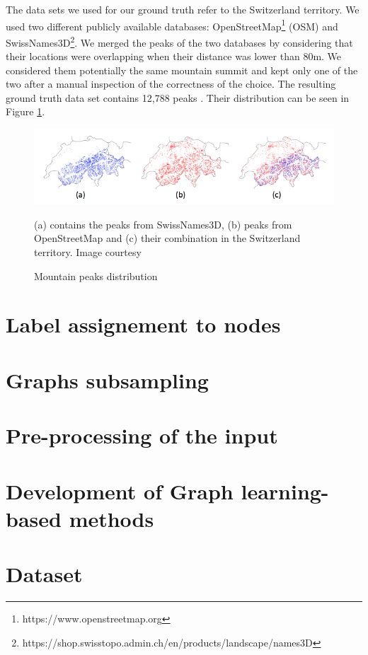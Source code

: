 The data sets we used for our ground truth refer to the Switzerland territory. We used two different publicly available databases: OpenStreetMap\footnote{https://www.openstreetmap.org} (OSM) and SwissNames3D\footnote{https://shop.swisstopo.admin.ch/en/products/landscape/names3D}. We merged the peaks of the two databases by considering that their locations were overlapping when their distance was lower than 80m. We considered them potentially the same mountain summit and kept only one of the two after a manual inspection of the correctness of the choice. The resulting ground truth data set contains 12,788 peaks \cite{AI3D-DL-PE}. Their distribution can be seen in Figure \ref{fig:switzerland_peaks}.

\begin{figure} 
\centering
\includegraphics[width=13cm]{pictures/switzerland_peaks.png}
\caption{Mountain peaks distribution}
(a) contains the peaks from SwissNames3D, (b) peaks from OpenStreetMap and (c) their combination in the Switzerland territory. Image courtesy \cite{AI3D-DL-PE}
\label{fig:switzerland_peaks}
\end{figure}

\section{Label assignement to nodes}

\section{Graphs subsampling}

\section{Pre-processing of the input}
\section{Development of Graph learning-based methods}
\section{Dataset}
